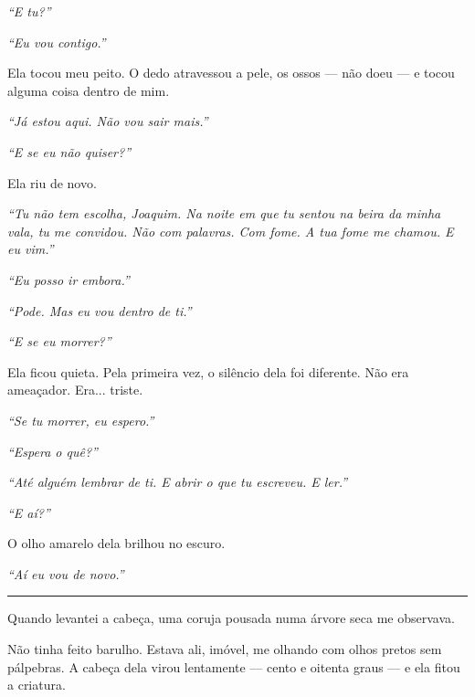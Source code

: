 \noindent \textit{\textquotedblleft{}E tu?\textquotedblright{}}

\noindent \textit{\textquotedblleft{}Eu vou contigo.\textquotedblright{}}

\noindent Ela tocou meu peito. O dedo atravessou a pele, os ossos --- não doeu --- e tocou alguma coisa dentro de mim.

\noindent \textit{\textquotedblleft{}Já estou aqui. Não vou sair mais.\textquotedblright{}}

\noindent \textit{\textquotedblleft{}E se eu não quiser?\textquotedblright{}}

\noindent Ela riu de novo.

\noindent \textit{\textquotedblleft{}Tu não tem escolha, Joaquim. Na noite em que tu sentou na beira da minha vala, tu me convidou. Não com palavras. Com fome. A tua fome me chamou. E eu vim.\textquotedblright{}}

\noindent \textit{\textquotedblleft{}Eu posso ir embora.\textquotedblright{}}

\noindent \textit{\textquotedblleft{}Pode. Mas eu vou dentro de ti.\textquotedblright{}}

\noindent \textit{\textquotedblleft{}E se eu morrer?\textquotedblright{}}

\noindent Ela ficou quieta. Pela primeira vez, o silêncio dela foi diferente. Não era ameaçador. Era... triste.

\noindent \textit{\textquotedblleft{}Se tu morrer, eu espero.\textquotedblright{}}

\noindent \textit{\textquotedblleft{}Espera o quê?\textquotedblright{}}

\noindent \textit{\textquotedblleft{}Até alguém lembrar de ti. E abrir o que tu escreveu. E ler.\textquotedblright{}}

\noindent \textit{\textquotedblleft{}E aí?\textquotedblright{}}

\noindent O olho amarelo dela brilhou no escuro.

\noindent \textit{\textquotedblleft{}Aí eu vou de novo.\textquotedblright{}}

\vspace{0.5em}\noindent\rule{\textwidth}{0.5pt}\vspace{0.5em}

\noindent Quando levantei a cabeça, uma coruja pousada numa árvore seca me observava.

\noindent Não tinha feito barulho. Estava ali, imóvel, me olhando com olhos pretos sem pálpebras. A cabeça dela virou lentamente --- cento e oitenta graus --- e ela fitou a criatura.

